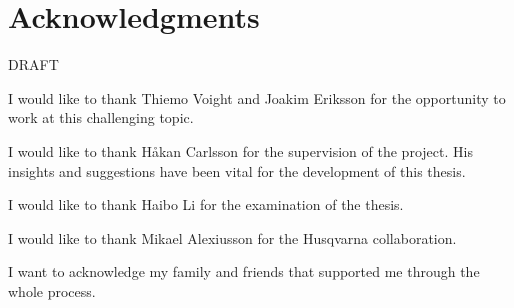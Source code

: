 
\section*{Acknowledgments }


DRAFT

\noindent I would like to thank Thiemo Voight and Joakim Eriksson for the opportunity to work at this challenging topic.

I would like to thank Håkan Carlsson for the supervision of the project.
His insights and suggestions have been vital for the development of this thesis.

I would like to thank Haibo Li for the examination of the thesis.

I would like to thank Mikael Alexiusson for the Husqvarna collaboration.

I want to acknowledge my family and friends that supported me through the whole process.

\acknowlegmentssignature

